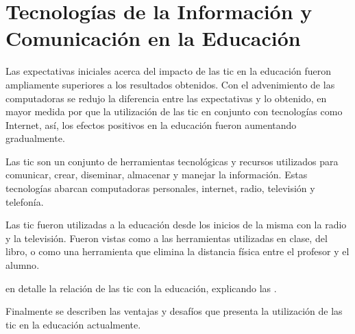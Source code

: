 \chapter[TIC's en la Educación]{Tecnologías de la Información y Comunicación en
    la Educación}
\label{chap:tics}

Las expectativas iniciales acerca del impacto de las \Gls{tic} en la educación
fueron ampliamente superiores a los resultados obtenidos\cite{unesco:ict}. Con
el advenimiento de las computadoras se redujo la diferencia entre las
expectativas y lo obtenido, en mayor medida por que la utilización de las
\Gls{tic} en conjunto con tecnologías como Internet, así, los efectos positivos
en la educación fueron aumentando gradualmente\cite{unesco:ict}.

Las \Gls{tic} son un conjunto de herramientas tecnológicas y recursos utilizados
para comunicar, crear, diseminar, almacenar y manejar la
información\cite{unesco:ict}. Estas tecnologías abarcan computadoras personales,
internet, radio, televisión y telefonía\cite{tinio:ict}.

Las \Gls{tic} fueron utilizadas  a la
educación desde los inicios de la misma con la radio y la televisión. Fueron
vistas como  a las herramientas utilizadas en
clase,  del libro, o como una herramienta
que elimina la distancia física entre el profesor y el alumno\cite{unesco:ict}. 

 en detalle la relación de las \Gls{tic} con la
educación, explicando las .

Finalmente se describen las ventajas y desafíos que presenta la utilización de
las \Gls{tic} en la educación actualmente.






% 
